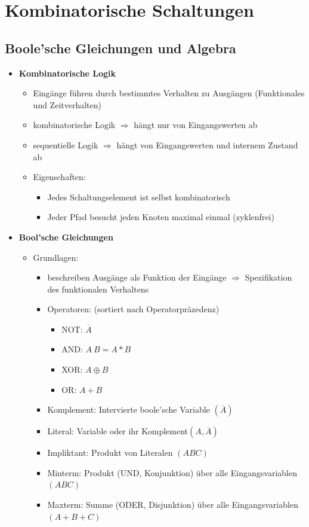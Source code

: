 \documentclass[11pt,a4paper]{article}
\begin{document}
\section{Kombinatorische Schaltungen}
\subsection{Boole'sche Gleichungen und Algebra}
\begin{itemize}
\item \textbf{Kombinatorische Logik}
	\begin{itemize}
	\item Eingänge führen durch bestimmtes Verhalten zu Ausgängen (Funktionales und Zeitverhalten)
	\item kombinatorische Logik $\Rightarrow$ hängt nur von Eingangswerten ab
	\item sequentielle Logik $\Rightarrow$ hängt von Eingangswerten und internem Zustand ab
	\item Eigenschaften:
		\begin{itemize}
		\item Jedes Schaltungselement ist selbst kombinatorisch
		\item Jeder Pfad besucht jeden Knoten maximal einmal (zyklenfrei)
		\end{itemize}
	\end{itemize}
	
\item \textbf{Bool'sche Gleichungen}
	\begin{itemize}
	\item Grundlagen:
		\begin{itemize}
		\item beschreiben Ausgänge als Funktion der Eingänge $\Rightarrow$ Spezifikation des funktionalen Verhaltens
		\item Operatoren: (sortiert nach Operatorpräzedenz)
			\begin{itemize}
			\item NOT: $\overline{A}$
			\item AND: $A~B=A*B$
			\item XOR: $A \oplus B$
			\item OR: $A+B$
			\end{itemize}
		\item Komplement: Intervierte boole'sche Variable $(\overline{A})$
		\item Literal: Variable oder ihr Komplement$(A, \overline{A})$
		\item Impliktant: Produkt von Literalen $(ABC)$
		\item Minterm: Produkt (UND, Konjunktion) über alle Eingangsvariablen $(ABC)$
		\item Maxterm: Summe (ODER, Disjunktion) über alle Eingangsvariablen $(A+B+C)$
		\end{itemize}
		

\end{itemize}
\end{itemize}
\end{document}
